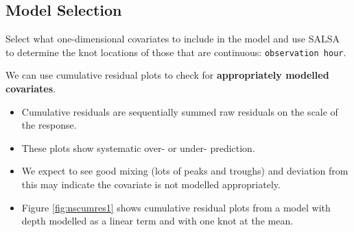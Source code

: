 
\subsection{Model Selection}
\begin{frame}[fragile]
Select what one-dimensional covariates to include in the model and use SALSA to determine the knot locations of those that are continuous: {\tt observation hour}.

\noindent We can use cumulative residual plots to check for \textbf{appropriately modelled covariates}.  
\begin{itemize}
\item Cumulative residuals are sequentially summed raw residuals on the scale of the response.
\item These plots show systematic over- or under- prediction.  
\item We expect to see good mixing (lots of peaks and troughs) and deviation from this may indicate the covariate is not modelled appropriately.
\item Figure \ref{fig:nscumres1} shows cumulative residual plots from a model with depth modelled as a linear term and with one knot at the mean.
\end{itemize} 
\end{frame}

